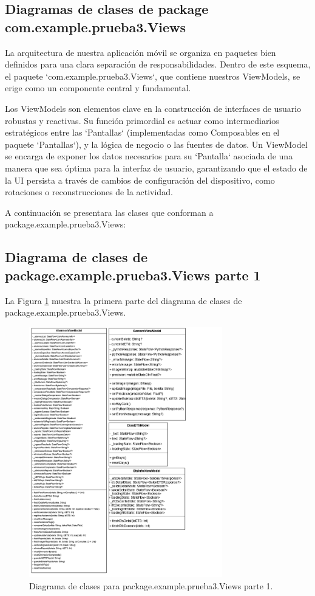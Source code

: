 \subsection{Diagramas de clases de package com.example.prueba3.Views}

La arquitectura de nuestra aplicación móvil se organiza en paquetes bien definidos para una clara separación de responsabilidades. Dentro de este esquema, el paquete `com.example.prueba3.Views`, que contiene nuestros ViewModels, se erige como un componente central y fundamental.

Los ViewModels son elementos clave en la construcción de interfaces de usuario robustas y reactivas. Su función primordial es actuar como intermediarios estratégicos entre las `Pantallas` (implementadas como Composables en el paquete `Pantallas`), y la lógica de negocio o las fuentes de datos. Un ViewModel se encarga de exponer los datos necesarios para su `Pantalla` asociada de una manera que sea óptima para la interfaz de usuario, garantizando que el estado de la UI persista a través de cambios de configuración del dispositivo, como rotaciones o reconstrucciones de la actividad.

A continuación se presentara las clases que conforman a package.example.prueba3.Views:


\subsection{Diagrama de clases de package.example.prueba3.Views parte 1}

La Figura \ref{fig:Views1} muestra la primera parte del diagrama de clases de package.example.prueba3.Views.

\begin{figure}[htbp!]
	\begin{center}
		\includegraphics[width=0.75\textwidth]{DiagramasMoviles/DCM (7)}
		\caption{Diagrama de clases para package.example.prueba3.Views parte 1.}
		\label{fig:Views1}
	\end{center}
\end{figure}

